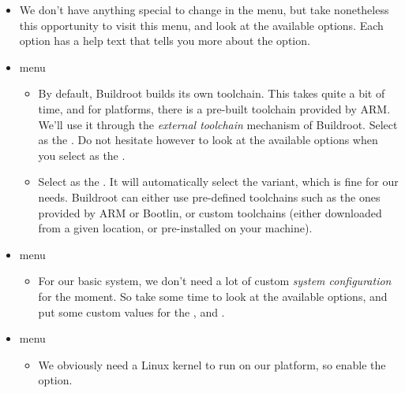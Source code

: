 \begin{itemize}
\item We don't have anything special to change in the
   menu, but take nonetheless this opportunity to
  visit this menu, and look at the available options. Each option has
  a help text that tells you more about the option.

\item {} menu

  \begin{itemize}

  \item By default, Buildroot builds its own toolchain. This takes
    quite a bit of time, and for  platforms, there is a
    pre-built toolchain provided by ARM. We'll use it through the
    {\em external toolchain} mechanism of Buildroot. Select
     as the . Do not
    hesitate however to look at the available options when you select
     as the .

  \item Select  as the . It
    will automatically select the  variant, which is fine for our
    needs. Buildroot can either use pre-defined toolchains such as the
    ones provided by ARM or Bootlin, or custom toolchains (either
    downloaded from a given location, or pre-installed on your
    machine).

  \end{itemize}

\item {} menu

  \begin{itemize}

  \item For our basic system, we don't need a lot of custom {\em
      system configuration} for the moment. So take some time to look
    at the available options, and put some custom values for the
    ,  and .

  \end{itemize}

\item {} menu

  \begin{itemize}

  \item We obviously need a Linux kernel to run on our platform, so
    enable the  option.


\end{itemize}
\end{itemize}
